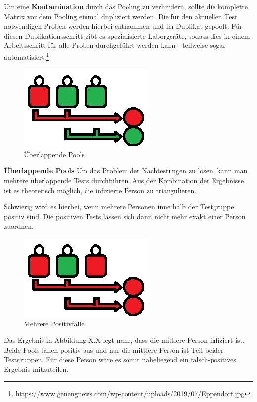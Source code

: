 Um eine \textbf{Kontamination} durch das Pooling zu verhindern, sollte die komplette Matrix vor dem Pooling einmal dupliziert werden. 
Die für den aktuellen Test notwendigen Proben werden hierbei entnommen und im Duplikat gepoolt.
Für diesen Duplikationsschritt gibt es spezialisierte Laborgeräte, sodass dies in einem Arbeitsschritt für alle Proben durchgeführt werden kann - teilweise sogar automatisiert.\footnote{https://www.genengnews.com/wp-content/uploads/2019/07/Eppendorf.jpg}

\begin{figure}[h]
	\centering
	\includegraphics[width=.4\textwidth]{img/KomplexePools}
	\caption{Überlappende Pools\footnotemark}
\end{figure}

\textbf{Überlappende Pools}\newline
Um das Problem der Nachtestungen zu lösen, kann man mehrere überlappende Tests durchführen.
Aus der Kombination der Ergebnisse ist es theoretisch möglich, die infizierte Person zu triangulieren.

Schwierig wird es hierbei, wenn mehrere Personen innerhalb der Testgruppe positiv sind.
Die positiven Tests lassen sich dann nicht mehr exakt einer Person zuordnen.
\cleardoublepage

\begin{figure}[h]
	\centering
	\includegraphics[width=.4\textwidth]{img/MehrerePositiv}
	\caption{Mehrere Positivfälle\footnotemark}
\end{figure}
Das Ergebnis in Abbildung X.X legt nahe, dass die mittlere Person infiziert ist.
Beide Pools fallen positiv aus und nur die mittlere Person ist Teil beider Testgruppen.
Für diese Person wäre es somit naheliegend ein falsch-positives Ergebnis mitzuteilen.

